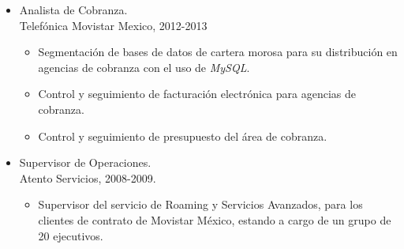 \documentclass[21pt, onecolumn]{article} %
\begin{document}
\begin{itemize}
 \item Analista de Cobranza.\\
 Telefónica Movistar Mexico, {2012-2013}
 \begin{itemize}
  \item Segmentación de bases de datos de cartera morosa para su distribución en agencias de
cobranza con el uso de \emph{MySQL}.
 \item Control y seguimiento de facturación electrónica para agencias de
cobranza.
 \item Control y seguimiento de presupuesto del área de cobranza.
 \end{itemize}

\item Supervisor de Operaciones.\\
Atento Servicios, 2008-2009.
\begin{itemize}
\item Supervisor del servicio de Roaming y Servicios Avanzados, para los
clientes de contrato de Movistar México, estando a cargo de un grupo de 20
ejecutivos.
\end{itemize}
%

\end{itemize}
\end{document}
